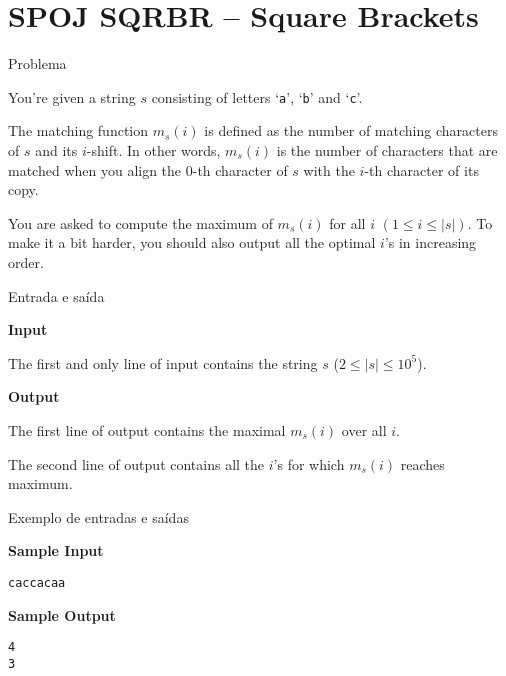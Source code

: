 \section{SPOJ SQRBR -- Square Brackets}

\begin{frame}[fragile]{Problema}

You're given a string $s$ consisting of letters `\texttt{a}', `\texttt{b}' and `\texttt{c}'.

The matching function $m_s(i)$ is defined as the number of matching characters of $s$ and its
$i$-shift. In other words, $m_s(i)$ is the number of characters that are matched when you align the
0-th character of $s$ with the $i$-th character of its copy.

You are asked to compute the maximum of $m_s(i)$ for all $i$ $(1\leq i\leq |s|)$. To make it a bit
harder, you should also output all the optimal $i$'s in increasing order.

\end{frame}

\begin{frame}[fragile]{Entrada e saída}

\textbf{Input}

The first and only line of input contains the string $s$ ($2\leq |s| \leq 10^5$).

\vspace{0.2in}

\textbf{Output}

The first line of output contains the maximal $m_s(i)$ over all $i$.

The second line of output contains all the $i$'s for which $m_s(i)$ reaches maximum.

\end{frame}

\begin{frame}[fragile]{Exemplo de entradas e saídas}

\begin{minipage}[t]{0.45\textwidth}
\textbf{Sample Input}
\begin{verbatim}
caccacaa
\end{verbatim}
\end{minipage}
\begin{minipage}[t]{0.5\textwidth}
\textbf{Sample Output}
\begin{verbatim}
4
3
\end{verbatim}
\end{minipage}
\end{frame}

